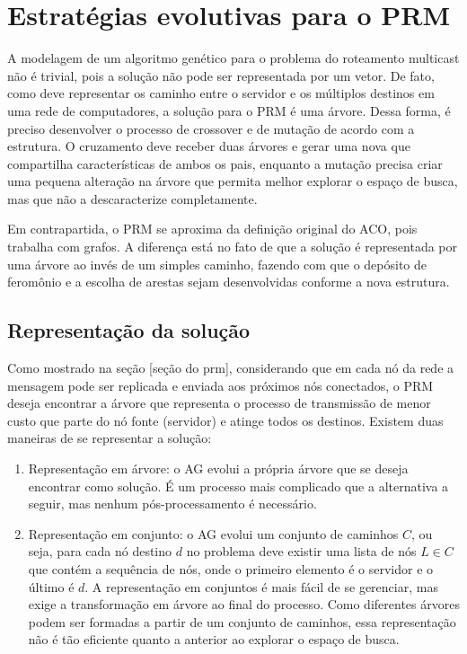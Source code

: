 \chapter[Estratégias evolutivas para o PRM]{Estratégias evolutivas para o PRM}

A modelagem de um algoritmo genético para o problema do roteamento multicast não é trivial, pois a solução não pode ser representada por um vetor. De fato, como deve representar os caminho entre o servidor e os múltiplos destinos em uma rede de computadores, a solução para o PRM é uma árvore. Dessa forma, é preciso desenvolver o processo de crossover e de mutação de acordo com a estrutura. O cruzamento deve receber duas árvores e gerar uma nova que compartilha características de ambos os pais, enquanto a mutação precisa criar uma pequena alteração na árvore que permita melhor explorar o espaço de busca, mas que não a descaracterize completamente.

Em contrapartida, o PRM se aproxima da definição original do ACO, pois trabalha com grafos. A diferença está no fato de que a solução é representada por uma árvore ao invés de um simples caminho, fazendo com que o depósito de feromônio e a escolha de arestas sejam desenvolvidas conforme a nova estrutura.

\section{Representação da solução}

Como mostrado na seção [seção do prm], considerando que em cada nó da rede a mensagem pode ser replicada e enviada aos próximos nós conectados, o PRM deseja encontrar a árvore que representa o processo de transmissão de menor custo que parte do nó fonte (servidor) e atinge todos os destinos. Existem duas maneiras de se representar a solução:

\begin{enumerate}
	\item Representação em árvore: o AG evolui a própria árvore que se deseja encontrar como solução. É um processo mais complicado que a alternativa a seguir, mas nenhum pós-processamento é necessário.
	\item Representação em conjunto: o AG evolui um conjunto de caminhos $C$, ou seja, para cada nó destino $d$ no problema deve existir uma lista de nós $L \in C$ que contém a sequência de nós, onde o primeiro elemento é o servidor e o último é $d$. A representação em conjuntos é mais fácil de se gerenciar, mas exige a transformação em árvore ao final do processo. Como diferentes árvores podem ser formadas a partir de um conjunto de caminhos, essa representação não é tão eficiente quanto a anterior ao explorar o espaço de busca.
\end{enumerate}

